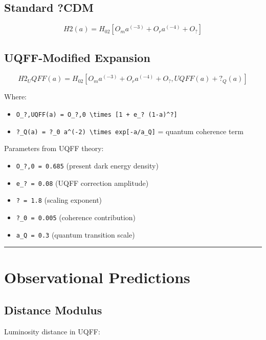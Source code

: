 \documentclass[12pt,a4paper]{article}
\begin{document}
\subsection{Standard ?CDM}

\begin{equation}
H2(a) = H_02 [O_m a^(-3) + O_r a^(-4) + O_?]
\end{equation}

\subsection{UQFF-Modified Expansion}

\begin{equation}
H2_UQFF(a) = H_02 [O_m a^(-3) + O_r a^(-4) + O_?,UQFF(a) + ?_Q(a)]
\end{equation}

Where:

\begin{itemize}
  \item \texttt{O\_?,UQFF(a) = O\_?,0 \textbackslash times [1 + e\_? (1-a)\^{}?]}
  \item \texttt{?\_Q(a) = ?\_0 a\^{}(-2) \textbackslash times exp[-a/a\_Q]} = quantum coherence term
\end{itemize}

Parameters from UQFF theory:

\begin{itemize}
  \item \texttt{O\_?,0 = 0.685} (present dark energy density)
  \item \texttt{e\_? = 0.08} (UQFF correction amplitude)
  \item \texttt{? = 1.8} (scaling exponent)
  \item \texttt{?\_0 = 0.005} (coherence contribution)
  \item \texttt{a\_Q = 0.3} (quantum transition scale)
\end{itemize}

\medskip\hrule\medskip

\section{Observational Predictions}

\subsection{Distance Modulus}

Luminosity distance in UQFF:
\end{document}
